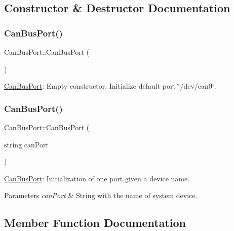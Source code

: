 \subsection{Constructor \& Destructor Documentation}
\mbox{\label{classCanBusPort_a4ccb8d39da6185bfe5c1dee38db51987}} 
\subsubsection{\texorpdfstring{Can\+Bus\+Port()}{CanBusPort()}\hspace{0.1cm}{\footnotesize\ttfamily [1/2]}}
{\footnotesize\ttfamily Can\+Bus\+Port\+::\+Can\+Bus\+Port (\begin{DoxyParamCaption}{ }\end{DoxyParamCaption})}



\hyperlink{classCanBusPort}{Can\+Bus\+Port}\+: Empty constructor. Initialize default port \char`\"{}/dev/can0\char`\"{}. 

\mbox{\label{classCanBusPort_ad4649a2da594bbffc267483646fb1405}} 
\subsubsection{\texorpdfstring{Can\+Bus\+Port()}{CanBusPort()}\hspace{0.1cm}{\footnotesize\ttfamily [2/2]}}
{\footnotesize\ttfamily Can\+Bus\+Port\+::\+Can\+Bus\+Port (\begin{DoxyParamCaption}\item[{string}]{can\+Port }\end{DoxyParamCaption})}



\hyperlink{classCanBusPort}{Can\+Bus\+Port}\+: Initialization of one port given a device name. 


\begin{DoxyParams}{Parameters}
{\em can\+Port} & String with the name of system device. \\
\hline
\end{DoxyParams}


\subsection{Member Function Documentation}
\mbox{\label{classCanBusPort_a13d6b06d93debc20b2f49aa8e7139988}} 
